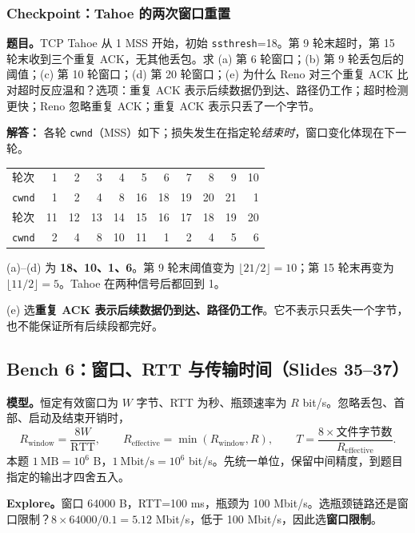 \documentclass[11pt,a4paper,fontset=fandol]{ctexart}
\renewcommand{\exercisequestion}[2]{%
  \Needspace{5\baselineskip}%
  \subsubsection{#2}\label{exercise:#1}%
}
\renewenvironment{checkedsolution}
  {\par\nopagebreak[4]\textbf{解答：}\ignorespaces}
  {\par}
\begin{document}
\exercisequestion{SC2008-HW05-Q05}{Checkpoint：Tahoe 的两次窗口重置}
\textbf{题目。}TCP Tahoe 从 1 MSS 开始，初始 \texttt{ssthresh}=18。第 9 轮末超时，第 15 轮末收到三个重复 ACK，无其他丢包。求 (a) 第 6 轮窗口；(b) 第 9 轮丢包后的阈值；(c) 第 10 轮窗口；(d) 第 20 轮窗口；(e) 为什么 Reno 对三个重复 ACK 比对超时反应温和？选项：重复 ACK 表示后续数据仍到达、路径仍工作；超时检测更快；Reno 忽略重复 ACK；重复 ACK 表示只丢了一个字节。
\begin{checkedsolution}
各轮 \texttt{cwnd}（MSS）如下；损失发生在指定轮\emph{结束时}，窗口变化体现在下一轮。
\begin{center}
\small
\begin{tabular}{@{}lrrrrrrrrrr@{}}
\toprule
轮次 & 1 & 2 & 3 & 4 & 5 & 6 & 7 & 8 & 9 & 10 \\
\texttt{cwnd} & 1 & 2 & 4 & 8 & 16 & 18 & 19 & 20 & 21 & 1 \\
\midrule
轮次 & 11 & 12 & 13 & 14 & 15 & 16 & 17 & 18 & 19 & 20 \\
\texttt{cwnd} & 2 & 4 & 8 & 10 & 11 & 1 & 2 & 4 & 5 & 6 \\
\bottomrule
\end{tabular}
\end{center}
(a)--(d) 为 \textbf{18、10、1、6}。第 9 轮末阈值变为 $\lfloor21/2\rfloor=10$；第 15 轮末再变为 $\lfloor11/2\rfloor=5$。Tahoe 在两种信号后都回到 1。

(e) 选\textbf{重复 ACK 表示后续数据仍到达、路径仍工作}。它不表示只丢失一个字节，也不能保证所有后续段都完好。
\end{checkedsolution}

\subsection{Bench 6：窗口、RTT 与传输时间（Slides 35--37）}

\textbf{模型。}恒定有效窗口为 $W$ 字节、RTT 为秒、瓶颈速率为 $R$ bit/s。忽略丢包、首部、启动及结束开销时，
\[
 R_{\mathrm{window}}=\frac{8W}{\mathrm{RTT}},\qquad
 R_{\mathrm{effective}}=\min(R_{\mathrm{window}},R),\qquad
 T=\frac{8\times\text{文件字节数}}{R_{\mathrm{effective}}}.
\]
本题 $1\ \mathrm{MB}=10^6$ B，$1\ \mathrm{Mbit/s}=10^6$ bit/s。先统一单位，保留中间精度，到题目指定的输出才四舍五入。

\textbf{Explore。}窗口 64000 B，RTT=100 ms，瓶颈为 100 Mbit/s。选瓶颈链路还是窗口限制？$8\times64000/0.1=5.12$ Mbit/s，低于 100 Mbit/s，因此选\textbf{窗口限制}。
\end{document}
